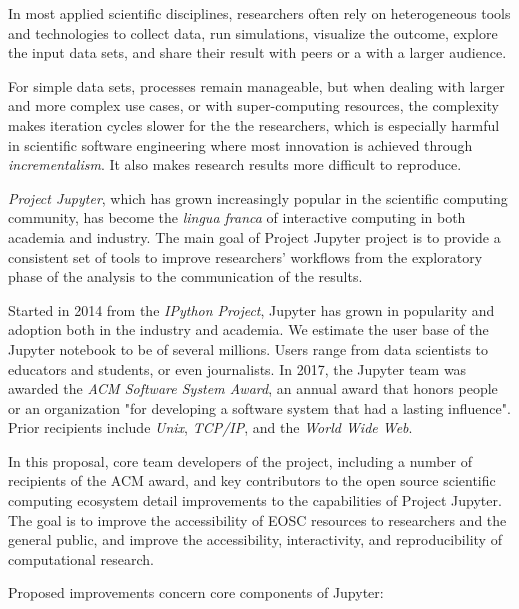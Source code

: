 In most applied scientific disciplines, researchers often rely on
heterogeneous tools and technologies to collect data, run simulations,
visualize the outcome, explore the input data sets, and share their
result with peers or a with a larger audience.

For simple data sets, processes remain manageable, but when dealing
with larger and more complex use cases, or with super-computing resources,
the complexity makes iteration cycles slower for the the researchers, which
is especially harmful in scientific software engineering where most innovation
is achieved through \emph{incrementalism}. It also makes research results more
difficult to reproduce.

\emph{Project Jupyter}, which has grown increasingly popular in the scientific
computing community, has become the \emph{lingua franca} of interactive
computing in both academia and industry. The main goal of Project Jupyter
project is to provide a consistent set of tools to improve researchers'
workflows from the exploratory phase of the analysis to the communication
of the results.

Started in 2014 from the \emph{IPython Project}, Jupyter has grown in
popularity and adoption both in the industry and academia. We estimate the user
base of the Jupyter notebook to be of several millions. Users range from data
scientists to educators and students, or even journalists. In 2017, the Jupyter
team was awarded the \emph{ACM Software System Award}, an annual award that
honors people or an organization "for developing a software system that had a
lasting influence". Prior recipients include \emph{Unix}, \emph{TCP/IP}, and
the \emph{World Wide Web}.

In this proposal, core team developers of the project, including a number of
recipients of the ACM award, and key contributors to the open source scientific
computing ecosystem detail improvements to the capabilities of Project Jupyter.
The goal is to improve the accessibility of EOSC resources to researchers and
the general public, and improve the accessibility, interactivity, and
reproducibility of computational research.

Proposed improvements concern core components of Jupyter:

